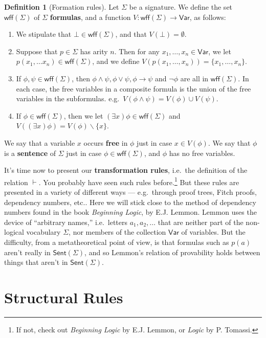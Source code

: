 \documentclass[10pt,fleqn]{article}
\theoremstyle{definition}
\newtheorem*{defn}{Definition}
\theoremstyle{remark}
\newcommand{\2}{\mathscr}
\renewcommand{\emph}{\textbf}
\begin{document}
\newcommand{\wff}{\mathsf{wff}(\Sigma )}
\newcommand{\sgsn}{\mathsf{Sent}(\Sigma )}

\begin{defn}[Formation rules] Let $\Sigma$ be a signature.  We define
  the set $\wff$ of $\Sigma$ \emph{formulas}, and a function $V:\wff
  \to \mathsf{Var}$, as follows:
\begin{enumerate}
\item We stipulate that $\bot\in \wff$, and that $V(\bot )=\emptyset$.
\item Suppose that $p\in\Sigma$ has arity $n$.  Then for any
  $x_1,\dots ,x_n\in \mathsf{Var}$, we let $p(x_1,\dots x_n)\in \wff
  $, and we define $V(p(x_1,\dots ,x_n))=\{ x_1,\dots ,x_n \}$.
\item If $\phi ,\psi \in \wff $, then $\phi\wedge\psi ,\phi\vee \psi
  ,\phi\to \psi$ and $\neg \phi$ are all in $\wff $.  In each case,
  the free variables in a composite formula is the union of the free
  variables in the subformulas.  e.g.\ $V(\phi\wedge\psi )=V(\phi
  )\cup V(\psi )$.
\item If $\phi\in \wff $, then we let $(\exists x)\phi \in \wff $ and
  $V((\exists x)\phi )=V(\phi )\backslash\{ x\}$.  \end{enumerate} We
say that a variable $x$ occurs \emph{free} in $\phi$ just in case
$x\in V(\phi )$.  We say that $\phi$ is a \emph{sentence} of $\Sigma$
just in case $\phi\in\wff$, and $\phi$ has no free variables.
\end{defn}

It's time now to present our \emph{transformation rules}, i.e.\ the
definition of the relation $\vdash$.  You probably have seen such
rules before.\footnote{If not, check out \textit{Beginning Logic} by
  E.J. Lemmon, or \textit{Logic} by P. Tomassi.}  But these rules are
presented in a variety of different ways --- e.g.\ through proof
trees, Fitch proofs, dependency numbers, etc..  Here we will stick
close to the method of dependency numbers found in the book
\textit{Beginning Logic}, by E.J. Lemmon.  Lemmon uses the device of
``arbitrary names,'' i.e.\ letters $a_1,a_2,\dots $ that are neither
part of the non-logical vocabulary $\Sigma$, nor members of the
collection $\mathsf{Var}$ of variables.  But the difficulty, from a
metatheoretical point of view, is that formulas such as $p(a)$ aren't
really in $\sgsn$, and so Lemmon's relation of provability holds
between things that aren't in $\sgsn$.




\section*{Structural Rules}
\end{document}
